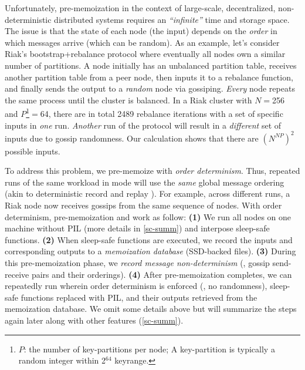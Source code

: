 Unfortunately, pre-memoization in the context of large-scale,
decentralized, non-deterministic distributed systems requires an {\em
  ``infinite''} time and storage space.  The issue is that the state of
each node (the input) depends on the {\em order} in which messages arrive
(which can be random).
%
As an example, let's consider Riak's bootstrap+rebalance protocol where
eventually all nodes own a similar number of partitions.  
A node initially has an unbalanced partition table, receives another
partition table from a peer node, then inputs it to a rebalance function,
and finally sends the output to a {\em random} node via gossiping.  {\em
  Every} node repeats the same process until the cluster is balanced.
%
In a Riak cluster
with $N$$=$256 and 
$P$\footnote{$P$: the number of key-partitions per node;  
A key-partition is typically a random integer 
within 2$^{64}$ keyrange.}$=$64, there are in total 2489 rebalance iterations
with a set of specific inputs in {\em one} run.  
{\em Another} run of the protocol will
result in a {\em different} set of inputs due to gossip randomness.
Our calculation shows that there are 
$(N^{NP})^2$ 
possible inputs.




To address this problem, we pre-memoize with {\em order determinism}.
Thus, repeated runs of the same workload in \sck mode will use the {\em
  same} global message ordering (akin to deterministic record and replay
\cite{Geels+07-Friday}).
%
For example, across different runs, a Riak node now receives gossips from
the same sequence of nodes.
%
With order determinism, pre-memoization and \sck work as follow: 
%
{\bf (1)} We run all nodes on one machine
without PIL (more details in \sec\ref{sc-summ}) and interpose
sleep-safe functions.
%
{\bf (2)} When sleep-safe functions are executed, we record the inputs and
corresponding outputs to a {\em memoization database} (SSD-backed files).
%
{\bf (3)} During this pre-memoization phase, 
we {\em record message non-determinism} (\eg,
gossip send-receive pairs and their orderings).
%
{\bf (4)} After pre-memoization completes, we can 
repeatedly run \sck wherein order
determinism is enforced (\eg, no randomness), sleep-safe functions
replaced with PIL, and their outputs retrieved from the memoization
database.
%
We omit some details above but will summarize the steps again later along
with other features (\sec\ref{sc-summ}).


